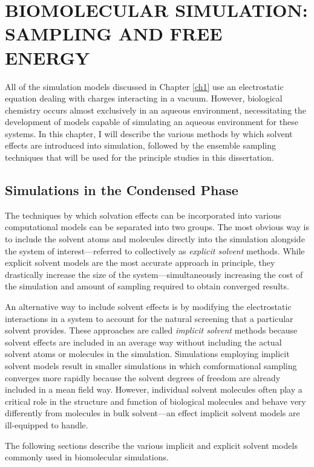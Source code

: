 \chapter{BIOMOLECULAR SIMULATION: SAMPLING AND FREE ENERGY}
\label{ch2}

All of the simulation models discussed in Chapter \ref{ch1} use an electrostatic
equation dealing with charges interacting in a vacuum. However, biological
chemistry occurs almost exclusively in an aqueous environment, necessitating the
development of models capable of simulating an aqueous environment for these
systems. In this chapter, I will describe the various methods by which solvent
effects are introduced into simulation, followed by the ensemble sampling
techniques that will be used for the principle studies in this dissertation.

\section{Simulations in the Condensed Phase}

The techniques by which solvation effects can be incorporated into various
computational models can be separated into two groups. The most obvious way is
to include the solvent atoms and molecules directly into the simulation
alongside the system of interest---referred to collectively as \emph{explicit
solvent} methods. While explicit solvent models are the most accurate approach
in principle, they drastically increase the size of the system---simultaneously
increasing the cost of the simulation and amount of sampling required to obtain
converged results.

An alternative way to include solvent effects is by modifying the electrostatic
interactions in a system to account for the natural screening that a particular
solvent provides. These approaches are called \emph{implicit solvent} methods
because solvent effects are included in an average way without including the
actual solvent atoms or molecules in the simulation. Simulations employing
implicit solvent models result in smaller simulations in which comformational
sampling converges more rapidly because the solvent degrees of freedom are
already included in a mean field way. However, individual solvent molecules
often play a critical role in the structure and function of biological molecules
and behave very differently from molecules in bulk solvent---an effect implicit
solvent models are ill-equipped to handle.

The following sections describe the various implicit and explicit solvent models
commonly used in biomolecular simulations.

